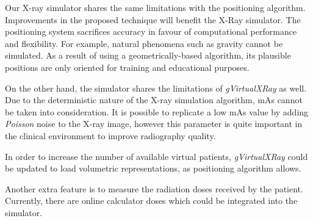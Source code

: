 Our X-ray simulator shares the same limitations with the positioning algorithm. Improvements in the proposed technique will benefit the X-Ray simulator. The positioning system sacrifices accuracy in favour of computational performance and flexibility. For example, natural phenomena such as gravity cannot be simulated. As a result of using a geometrically-based algorithm, its plausible positions are only oriented for training and educational purposes.



On the other hand, the simulator shares the limitations of \emph{gVirtualXRay} as well. Due to the deterministic nature of the X-ray simulation algorithm, mAs cannot be taken into consideration. It is possible to replicate a low mAs value by adding \emph{Poisson} noise to the X-ray image, however this parameter is quite important in the clinical environment to improve radiography quality.


In order to increase the number of available virtual patients,  \emph{gVirtualXRay} could be updated to load volumetric representations, as positioning algorithm allows. 


Another extra feature is to measure the radiation doses received by the patient. Currently, there are online calculator doses  \cite{xraydose} which could be integrated into the simulator.

